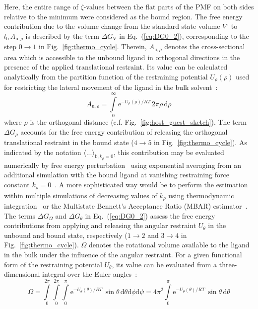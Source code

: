 \documentclass[9pt,lessons]{livecoms}
\begin{document}
Here, the entire range of $\zeta$-values between the flat parts of the PMF on both sides relative to the minimum were considered as the bound region. 
The free energy contribution due to the volume change from the standard state volume $V^\circ$ to $l_\mathrm{b} \, A_{\mathrm{u},\rho}$ is described by the term $\Delta G_\mathrm{V}$ in Eq.~(\ref{eq:DG0_2}), 
corresponding to the step $0 \rightarrow 1$ in Fig.~\ref{fig:thermo_cycle}.
Therein, $A_{\mathrm{u},\rho}$ denotes the cross-sectional area which is accessible to the unbound ligand in orthogonal directions in the presence of the applied translational restraint.
Its value can be calculated analytically from the partition function of the restraining potential $U_\rho(\rho)$ used for restricting the lateral movement of the ligand in the bulk solvent~\cite{doudou2009standard, markthaler2017molecular}:
\begin{equation}
	A_{\mathrm{u},\rho} = \int\limits_{0}^\infty \mathrm{e}^{- U_\rho(\rho)/RT} \, 2 \pi \rho\, \mathrm{d}\rho
\label{eq:Au}
\end{equation}
where $\rho$ is the orthogonal distance (c.f. Fig.~\ref{fig:host_guest_sketch}). 
The term $\Delta G_\rho$ accounts for the free energy contribution of releasing the orthogonal translational restraint in the bound state ($4 \rightarrow 5$ in Fig.~\ref{fig:thermo_cycle}).
As indicated by the notation $\langle ... \rangle_{\mathrm{b}, k_\rho=0}$, this contribution may be evaluated numerically by free energy perturbation~\cite{zwanzig1954high} using exponential averaging from an additional simulation with the bound ligand at vanishing restraining force constant $k_\rho=0$~\cite{doudou2009standard}.
A more sophisticated way would be to perform the estimation within multiple simulations of decreasing values of $k_\rho$ using thermodynamic integration~\cite{kirkwood1935statistical} or the Multistate Bennett's Acceptance Ratio (MBAR) estimator~\cite{shirts2008statistically}.
%
The terms $\Delta G_\Omega$ and $\Delta G_\theta$ in Eq.~(\ref{eq:DG0_2}) assess the free energy contributions from applying and releasing the angular restraint $U_\theta$ in the unbound and bound state, respectively 
($1 \rightarrow 2$ and $3 \rightarrow 4$ in Fig.~\ref{fig:thermo_cycle}).
$\Omega$ denotes the rotational volume available to the ligand in the bulk under the influence of the angular restraint. 
For a given functional form of the restraining potential $U_\theta$, its value can be evaluated from a three-dimensional integral over the Euler angles~\cite{hermans1997inclusion, steinberg1963entropy}:
\begin{equation}
\Omega = \int\limits_{0}^{2 \pi}\int\limits_{0}^{2 \pi}\int\limits_{0}^{\pi} \mathrm{e}^{- U_\theta(\theta)/RT} \, \sin\theta \, \mathrm{d}\theta \mathrm{d}\phi \mathrm{d}\psi
              = 4 \pi^2  \int\limits_{0}^{\pi} \mathrm{e}^{- U_\theta(\theta)/RT} \, \sin\theta \, \mathrm{d}\theta
\label{eq:Omega}
\end{equation}
\end{document}
